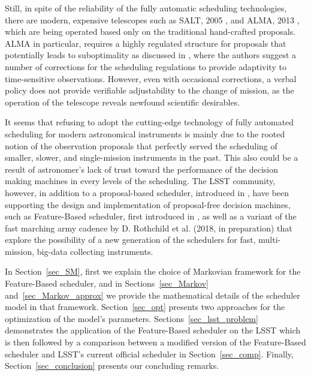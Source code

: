 \documentclass[12pt]{aastex62}
\theoremstyle{definition}
\begin{document}
Still, in spite of the reliability of the fully automatic scheduling technologies, there are modern, expensive telescopes such as SALT, 2005 \citep{brink2008salt}, and ALMA, 2013 \citep{wootten2003atacama}, which are being operated based only on the traditional hand-crafted proposals. ALMA in particular, requires a highly regulated structure for proposals that potentially leads to suboptimality as discussed in \citep{alexander2017enabling}, where the authors suggest a number of corrections for the scheduling regulations to provide adaptivity to time-sensitive observations. However, even with occasional corrections, a verbal policy does not provide verifiable adjustability to the change of mission, as the operation of the telescope reveals newfound scientific desirables.

It seems that refusing to adopt the cutting-edge technology of fully automated scheduling for modern astronomical instruments is mainly due to the rooted notion of the observation proposals that perfectly served the scheduling of smaller, slower, and single-mission instruments in the past. This also could be a result of astronomer's lack of trust toward the performance of the decision making machines in every levels of the scheduling. The LSST community, however, in addition to a proposal-based scheduler, introduced in \citep{delgado2016lsst}, have been supporting the design and implementation of proposal-free decision machines, such as Feature-Based scheduler, first introduced in \citep{naghib2016feature}, as well as a variant of the fast marching army cadence by D. Rothchild et al. (2018, in preparation) that explore the possibility of a new generation of the schedulers for fast, multi-mission, big-data collecting instruments.




In Section~\ref{sec_SM}, first we explain the choice of Markovian framework for the Feature-Based scheduler, and in Sections~\ref{sec_Markov} and~\ref{sec_Markov_approx} we provide the mathematical details of the scheduler model in that framework. Section~\ref{sec_opt} presents two approaches for the optimization of the model's parameters. Sections~\ref{sec_lsst_problem} demonstrates the application of the Feature-Based scheduler on the LSST which is then followed by a comparison between a modified version of the Feature-Based scheduler and LSST's current official scheduler in Section~\ref{sec_comp}. Finally, Section~\ref{sec_conclusion} presents our concluding remarks.
\end{document}
